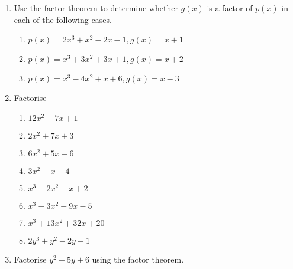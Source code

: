 \begin{enumerate}[label=\thesubsection.\arabic*, ref=\thesubsection.\theenumi,resume*]
\item Use the factor theorem to determine whether $g(x)$ is a factor of $p(x)$ in each of the following cases.
	\begin{enumerate}
		\item $p(x) = 2x^3+x^2-2x-1, g(x) = x+1$
		\item $p(x) = x^3+3x^2+3x+1, g(x) = x+2$
		\item $p(x) = x^3-4x^2+x+6, g(x) = x-3$
	\end{enumerate}
\item Factorise
	\begin{enumerate}
		\item $12x^2-7x + 1$
		\item $2x^2+7x + 3$
		\item $6x^2+5x - 6$
		\item $3x^2-x - 4$
		\item $x^3-2x^2 - x+2$
		\item $x^3-3x^2 - 9x-5$
		\item $x^3+13x^2 +32x+20$
		\item $2y^3+y^2 - 2y+1$
\end{enumerate}
\item Factorise $y^2-5y+6$ using the factor theorem.
\end{enumerate}
